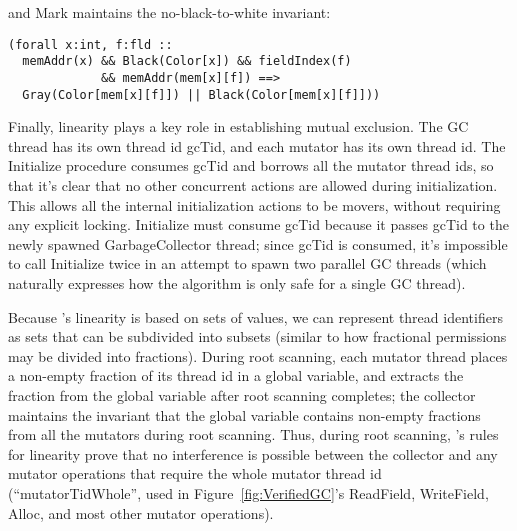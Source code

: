 and Mark maintains the no-black-to-white invariant:

\begin{verbatim}
(forall x:int, f:fld ::
  memAddr(x) && Black(Color[x]) && fieldIndex(f)
             && memAddr(mem[x][f]) ==>
  Gray(Color[mem[x][f]]) || Black(Color[mem[x][f]]))
\end{verbatim}

Finally, linearity plays a key role in establishing mutual exclusion.
The GC thread has its own thread id gcTid, and each mutator has its own thread id.
The Initialize procedure consumes gcTid and borrows all the mutator thread ids,
so that it's clear that no other concurrent actions are allowed during initialization.
This allows all the internal initialization actions to be movers, without requiring any explicit locking.
Initialize must consume gcTid because it passes gcTid to the newly spawned GarbageCollector thread;
since gcTid is consumed, it's impossible to call Initialize twice in an attempt to spawn two parallel GC threads
(which naturally expresses how the algorithm is only safe for a single GC thread).

Because \civl's linearity is based on sets of values,
we can represent thread identifiers as sets that can be subdivided into subsets
(similar to how fractional permissions may be divided into fractions).
During root scanning, each mutator thread places a non-empty fraction of its thread id in a global variable,
and extracts the fraction from the global variable after root scanning completes;
the collector maintains the invariant that the global variable contains non-empty fractions from all the mutators during root scanning.
Thus, during root scanning, \civl's rules for linearity prove that no interference is possible
between the collector and any mutator operations that require the whole mutator thread id
(``mutatorTidWhole'', used in Figure~\ref{fig:VerifiedGC}'s ReadField, WriteField, Alloc,
and most other mutator operations).

